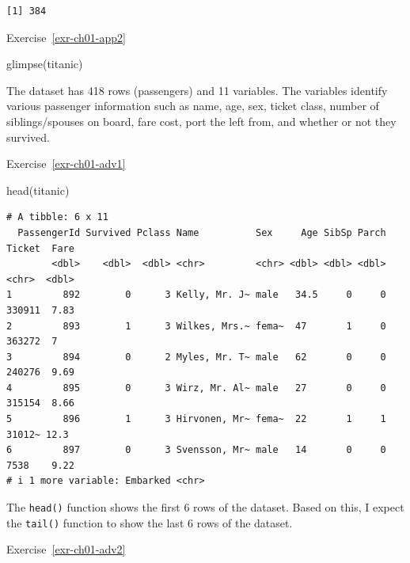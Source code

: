 \documentclass[
  letterpaper,
  DIV=11,
  numbers=noendperiod]{scrreprt}
\newenvironment{Shaded}{\begin{snugshade}}{\end{snugshade}}
\newcommand{\FunctionTok}[1]{\textcolor[rgb]{0.28,0.35,0.67}{#1}}
\newcommand{\NormalTok}[1]{\textcolor[rgb]{0.00,0.23,0.31}{#1}}
\newcommand{\SpecialCharTok}[1]{\textcolor[rgb]{0.37,0.37,0.37}{#1}}
\theoremstyle{definition}
\theoremstyle{remark}
\begin{document}
\begin{verbatim}
[1] 384
\end{verbatim}

Exercise~\ref{exr-ch01-app2}

\begin{Shaded}
\begin{Highlighting}[]
\FunctionTok{glimpse}\NormalTok{(titanic)}
\end{Highlighting}
\end{Shaded}

The dataset has 418 rows (passengers) and 11 variables. The variables
identify various passenger information such as name, age, sex, ticket
class, number of siblings/spouses on board, fare cost, port the left
from, and whether or not they survived.

Exercise~\ref{exr-ch01-adv1}

\begin{Shaded}
\begin{Highlighting}[]
\FunctionTok{head}\NormalTok{(titanic)}
\end{Highlighting}
\end{Shaded}

\begin{verbatim}
# A tibble: 6 x 11
  PassengerId Survived Pclass Name          Sex     Age SibSp Parch Ticket  Fare
        <dbl>    <dbl>  <dbl> <chr>         <chr> <dbl> <dbl> <dbl> <chr>  <dbl>
1         892        0      3 Kelly, Mr. J~ male   34.5     0     0 330911  7.83
2         893        1      3 Wilkes, Mrs.~ fema~  47       1     0 363272  7   
3         894        0      2 Myles, Mr. T~ male   62       0     0 240276  9.69
4         895        0      3 Wirz, Mr. Al~ male   27       0     0 315154  8.66
5         896        1      3 Hirvonen, Mr~ fema~  22       1     1 31012~ 12.3 
6         897        0      3 Svensson, Mr~ male   14       0     0 7538    9.22
# i 1 more variable: Embarked <chr>
\end{verbatim}

The \texttt{head()} function shows the first 6 rows of the dataset.
Based on this, I expect the \texttt{tail()} function to show the last 6
rows of the dataset.

Exercise~\ref{exr-ch01-adv2}

\begin{Shaded}
\end{Shaded}
\end{document}
